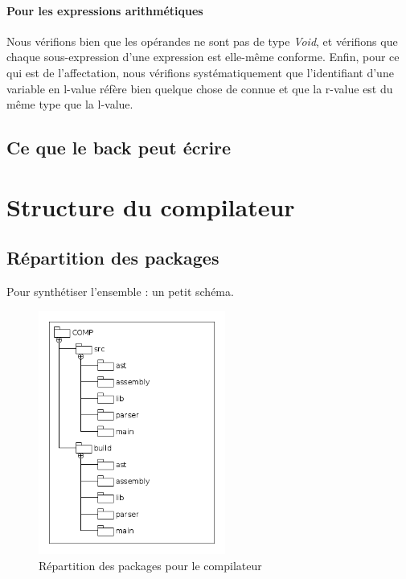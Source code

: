 \documentclass{report}
\begin{document}
\paragraph{Pour les expressions arithmétiques} Nous vérifions bien que les opérandes ne sont pas de type \emph{Void}, et vérifions que chaque sous-expression d'une expression est elle-même conforme. Enfin, pour ce qui est de l'affectation, nous vérifions systématiquement que l'identifiant d'une variable en l-value réfère bien quelque chose de connue et que la r-value est du même type que la l-value.\\

\subsection{Ce que le back peut écrire}
\label{subsec:Back}

\section{Structure du compilateur}
\label{sec:Struct}

\subsection{Répartition des packages}
\label{subsec:Pack}

Pour synthétiser l'ensemble : un petit schéma.

\begin{figure}[!hbt]\begin{center}
\includegraphics[height=8cm]{Folder_diagram}
\caption{Répartition des packages pour le compilateur}
\label{fig:Package}
\end{center}\end{figure}
\end{document}
